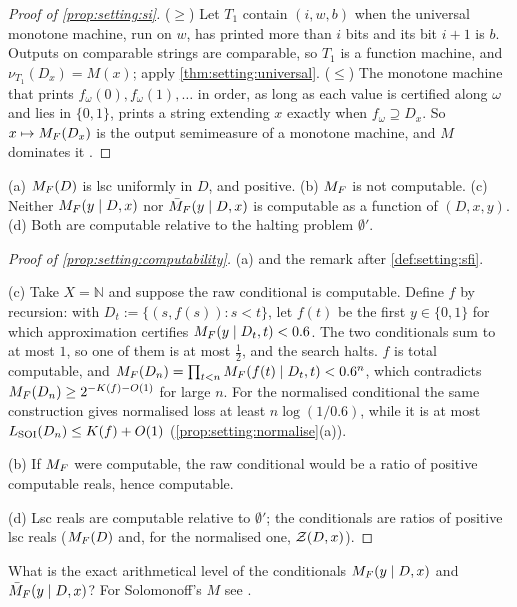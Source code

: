 \begin{proof}[Proof of \cref{prop:setting:si}]
($\ge$) Let $T_1$ contain $(i,w,b)$ when the universal monotone machine, run on $w$, has printed more than $i$ bits and its bit $i+1$ is $b$. Outputs on comparable strings are comparable, so $T_1$ is a function machine, and $\nu_{T_1}(D_x)=M(x)$; apply \cref{thm:setting:universal}. ($\le$) The monotone machine that prints $f_\omega(0),f_\omega(1),\dots$ in order, as long as each value is certified along $\omega$ and lies in $\{0,1\}$, prints a string extending $x$ exactly when $f_\omega\supseteq D_x$. So $x\mapsto M_{F}(D_x)$ is the output semimeasure of a monotone machine, and $M$ dominates it \citep{zvonkin1970complexity}.
\end{proof}

\begin{proposition}[Computability]\label{prop:setting:computability}
(a) $M_{F}(D)$ is lsc uniformly in $D$, and positive. (b) $M_{F}$ is not computable. (c) Neither $M_{F}(y\mid D,x)$ nor $\bar{M}_{F}(y\mid D,x)$ is computable as a function of $(D,x,y)$. (d) Both are computable relative to the halting problem $\emptyset'$.
\end{proposition}

\begin{proof}[Proof of \cref{prop:setting:computability}]
(a)  and the remark after \cref{def:setting:sfi}.

(c) Take $X=\mathbb N$ and suppose the raw conditional is computable. Define $f$ by recursion: with $D_t:=\{(s,f(s)):s<t\}$, let $f(t)$ be the first $y\in\{0,1\}$ for which approximation certifies $M_{F}(y\mid D_t,t)<0.6$. The two conditionals sum to at most $1$, so one of them is at most $\frac12$, and the search halts. $f$ is total computable, and $M_{F}(D_n)=\prod_{t<n}M_{F}(f(t)\mid D_t,t)<0.6^n$, which contradicts $M_{F}(D_n)\ge2^{-K(f)-O(1)}$ for large $n$. For the normalised conditional the same construction gives normalised loss at least $n\log(1/0.6)$, while it is at most $L_{\mathrm{SOI}}(D_n)\le K(f)+O(1)$ (\cref{prop:setting:normalise}(a)).

(b) If $M_{F}$ were computable, the raw conditional would be a ratio of positive computable reals, hence computable.

(d) Lsc reals are computable relative to $\emptyset'$; the conditionals are ratios of positive lsc reals ($M_{F}(D)$ and, for the normalised one, $\mathcal{Z}(D,x)$).
\end{proof}

\begin{question}\label{q:setting:level}
What is the exact arithmetical level of the conditionals $M_{F}(y\mid D,x)$ and $\bar{M}_{F}(y\mid D,x)$? For Solomonoff's $M$ see \citet{leike2015computability}.
\end{question}
